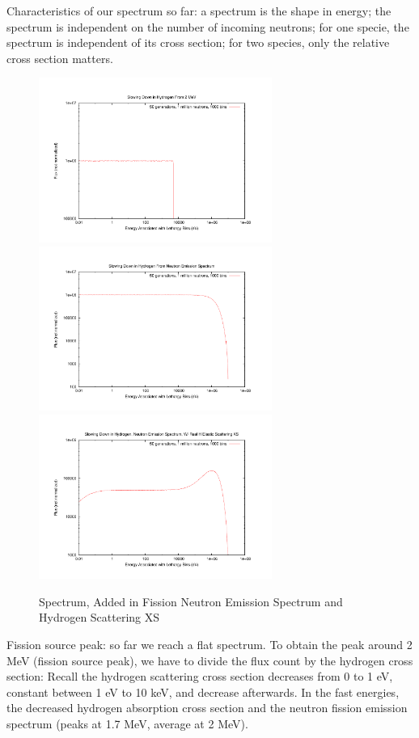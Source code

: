 \documentclass{school-22.211-notes}
\begin{document}
Characteristics of our spectrum so far: a spectrum is the shape in energy; the spectrum is independent on the number of incoming neutrons; for one specie, the spectrum is independent of its cross section; for two species, only the relative cross section matters. 
\begin{figure}
  \centering
  \includegraphics[width=3in]{images/sl-d/spec-1.uncrop.pdf}
  \includegraphics[width=3in]{images/sl-d/spec-2.uncrop.pdf}
  \includegraphics[width=3in]{images/sl-d/spec-3.uncrop.pdf}
  \caption{Spectrum, Added in Fission Neutron Emission Spectrum and Hydrogen Scattering XS} \label{spe1}
\end{figure}

Fission source peak: so far we reach a flat spectrum. To obtain the peak around 2 MeV (fission source peak), we have to divide the flux count by the hydrogen cross section:
Recall the hydrogen scattering cross section decreases from 0 to 1 eV, constant between 1 eV to 10 keV, and decrease afterwards. In the fast energies, the decreased hydrogen absorption cross section and the neutron fission emission spectrum (peaks at 1.7 MeV, average at 2 MeV). 
\end{document}
